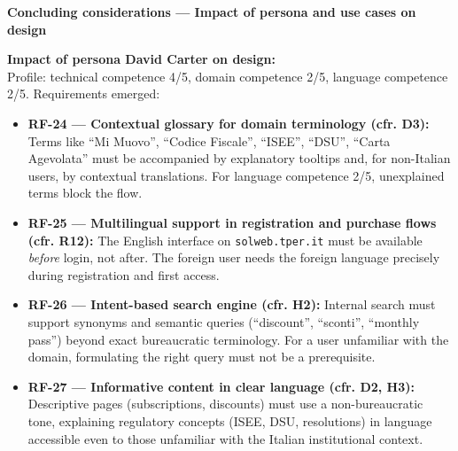 ﻿\documentclass[11pt,a4paper]{article}
\begin{document}
\vspace{0.3cm}


\begin{tcolorbox}[sectionbox,colback=primaryColor!10]
    \textbf{Concluding considerations --- Impact of persona and use cases on design}
\end{tcolorbox}
\vspace{0.3cm}

\begin{tcolorbox}[base]
    {\small
    \textbf{Impact of persona David Carter on design:} \\[4pt]
    Profile: technical competence 4/5, domain competence 2/5, language competence 2/5. Requirements emerged:

    \begin{itemize}[leftmargin=*]
        \item \textbf{RF-24 --- Contextual glossary for domain terminology (cfr. D3):} Terms like ``Mi Muovo'', ``Codice Fiscale'', ``ISEE'', ``DSU'', ``Carta Agevolata'' must be accompanied by explanatory tooltips and, for non-Italian users, by contextual translations. For language competence 2/5, unexplained terms block the flow.

        \item \textbf{RF-25 --- Multilingual support in registration and purchase flows (cfr. R12):} The English interface on \texttt{solweb.tper.it} must be available \textit{before} login, not after. The foreign user needs the foreign language precisely during registration and first access.

        \item \textbf{RF-26 --- Intent-based search engine (cfr. H2):} Internal search must support synonyms and semantic queries (``discount'', ``sconti'', ``monthly pass'') beyond exact bureaucratic terminology. For a user unfamiliar with the domain, formulating the right query must not be a prerequisite.

        \item \textbf{RF-27 --- Informative content in clear language (cfr. D2, H3):} Descriptive pages (subscriptions, discounts) must use a non-bureaucratic tone, explaining regulatory concepts (ISEE, DSU, resolutions) in language accessible even to those unfamiliar with the Italian institutional context.
    \end{itemize}
    }
\end{tcolorbox}
\end{document}
